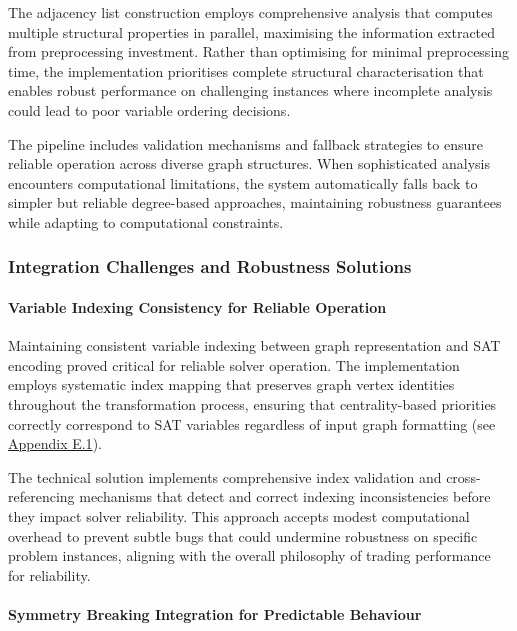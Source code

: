 The adjacency list construction employs comprehensive analysis that computes multiple structural properties in parallel, maximising the information extracted from preprocessing investment. Rather than optimising for minimal preprocessing time, the implementation prioritises complete structural characterisation that enables robust performance on challenging instances where incomplete analysis could lead to poor variable ordering decisions.

The pipeline includes validation mechanisms and fallback strategies to ensure reliable operation across diverse graph structures. When sophisticated analysis encounters computational limitations, the system automatically falls back to simpler but reliable degree-based approaches, maintaining robustness guarantees while adapting to computational constraints.

\subsubsection{Integration Challenges and Robustness Solutions}

\paragraph{Variable Indexing Consistency for Reliable Operation}

Maintaining consistent variable indexing between graph representation and SAT encoding proved critical for reliable solver operation. The implementation employs systematic index mapping that preserves graph vertex identities throughout the transformation process, ensuring that centrality-based priorities correctly correspond to SAT variables regardless of input graph formatting (see \hyperref[appendix:variable-indexing]{Appendix E.1}).

The technical solution implements comprehensive index validation and cross-ref\-er\-enc\-ing mechanisms that detect and correct indexing inconsistencies before they impact solver reliability. This approach accepts modest computational overhead to prevent subtle bugs that could undermine robustness on specific problem instances, aligning with the overall philosophy of trading performance for reliability.

\paragraph{Symmetry Breaking Integration for Predictable Behaviour}

